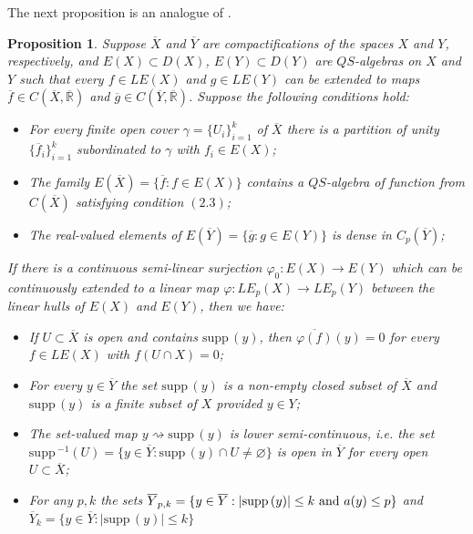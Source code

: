 \documentclass[12pt]{amsart}
\newtheorem{pro}[thm]{Proposition}
\def\supp{{\mathrm {supp}}\,}
\begin{document}
The next proposition is an analogue of \cite[Proposition 4.1]{ev}.
\begin{pro}
Suppose $\overline X$ and $\overline Y$ are compactifications of the spaces $X$ and $Y$, respectively, and $E(X)\subset D(X)$, $E(Y)\subset D(Y)$ are $QS$-algebras on $X$ and $Y$ such that every $f\in LE(X)$ and $g\in LE(Y)$ can be extended to maps $\overline f\in C(\overline X,\overline{\mathbb R})$ and $\overline g\in C(\overline Y,\overline{\mathbb R})$. Suppose the following conditions hold:
\begin{itemize}
\item[(1)] For every finite open cover $\gamma=\{U_i\}_{i=1}^k$ of $\overline X$ there is a partition of unity $\{\overline f_i\}_{i=1}^k$ subordinated to $\gamma$ with $f_i\in E(X)$;
\item[(2)] The family $E(\overline X)=\{\overline f:f\in E(X)\}$ contains a $QS$-algebra of function from $C(\overline X)$ satisfying condition $(2.3)$;
\item[(3)] The real-valued elements of $E(\overline Y)=\{\overline g:g\in E(Y)\}$ is dense in $C_p(\overline Y)$;     
\end{itemize}
If there is a continuous semi-linear surjection $\varphi_0:E(X)\to E(Y)$ which can be continuously extended to a linear map $\varphi:LE_p(X)\to LE_p(Y)$ between the linear hulls of $E(X)$ and $E(Y)$, then we have:
\begin{itemize}
\item[(a)] If $U\subset\overline X$ is open and contains $\supp(y)$, then $\overline{\varphi(f)}(y)=0$ for every $f\in LE(X)$ with $f(U\cap X)=0$;
\item[(b)] For every $y\in\overline Y$ the set $\supp(y)$ is a non-empty closed subset of $\overline X$ and $\supp(y)$ is a finite subset of  $X$ provided $y\in Y$;
\item[(c)] The set-valued map $y\rightsquigarrow\supp(y)$ is lower semi-continuous, i.e. the set $\supp^{-1}(U)=\{y\in\overline Y:\supp(y)\cap U\neq\varnothing\}$ is open in $\overline Y$ for every open $U\subset\overline X$;
\item[(d)] For any $p,k$ the sets $\overline Y_{p,k}=\{y\in\overline Y:|\supp(y)|\leq k{~}\hbox{and}{~}a(y)\leq p\}$ and $\overline Y_k=\{y\in\overline Y:|\supp(y)|\leq k\}$

\end{itemize}
\end{pro}
\end{document}
